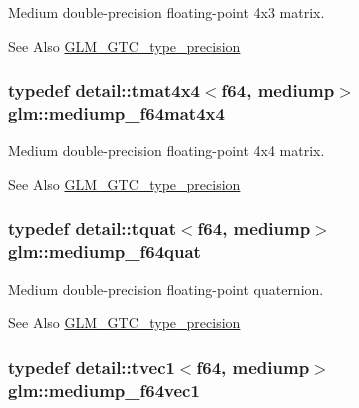 Medium double-\/precision floating-\/point 4x3 matrix. \begin{DoxySeeAlso}{See Also}
\hyperlink{group__gtc__type__precision}{G\-L\-M\-\_\-\-G\-T\-C\-\_\-type\-\_\-precision} 
\end{DoxySeeAlso}
\hypertarget{group__gtc__type__precision_ga941e42a0b337b5c8ad9c324aaa6b2ad5}{
\subsubsection[{mediump\-\_\-f64mat4x4}]{\setlength{\rightskip}{0pt plus 5cm}typedef detail\-::tmat4x4$<$f64, mediump$>$ {\bf glm\-::mediump\-\_\-f64mat4x4}}}\label{group__gtc__type__precision_ga941e42a0b337b5c8ad9c324aaa6b2ad5}
Medium double-\/precision floating-\/point 4x4 matrix. \begin{DoxySeeAlso}{See Also}
\hyperlink{group__gtc__type__precision}{G\-L\-M\-\_\-\-G\-T\-C\-\_\-type\-\_\-precision} 
\end{DoxySeeAlso}
\hypertarget{group__gtc__type__precision_ga7cf626acf7f4fc29355c147bfe05163d}{
\subsubsection[{mediump\-\_\-f64quat}]{\setlength{\rightskip}{0pt plus 5cm}typedef detail\-::tquat$<$f64, mediump$>$ {\bf glm\-::mediump\-\_\-f64quat}}}\label{group__gtc__type__precision_ga7cf626acf7f4fc29355c147bfe05163d}
Medium double-\/precision floating-\/point quaternion. \begin{DoxySeeAlso}{See Also}
\hyperlink{group__gtc__type__precision}{G\-L\-M\-\_\-\-G\-T\-C\-\_\-type\-\_\-precision} 
\end{DoxySeeAlso}
\hypertarget{group__gtc__type__precision_ga1e3bbbd9ce5e215c4ba0980264b2711d}{
\subsubsection[{mediump\-\_\-f64vec1}]{\setlength{\rightskip}{0pt plus 5cm}typedef detail\-::tvec1$<$f64, mediump$>$ {\bf glm\-::mediump\-\_\-f64vec1}}}\label{group__gtc__type__precision_ga1e3bbbd9ce5e215c4ba0980264b2711d}
